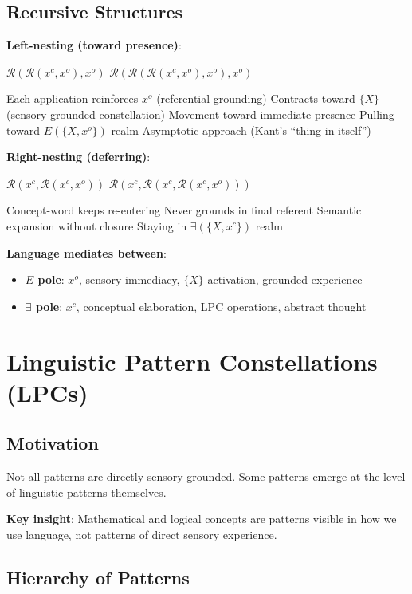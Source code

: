 \documentclass[12pt]{article}
\providecommand{\tightlist}{}   %
\begin{document}
\subsection{Recursive Structures}\label{recursive-structures}

\textbf{Left-nesting (toward presence)}:

\(\mathcal{R}(\mathcal{R}(x^c, x^o), x^o)\) \(\mathcal{R}(\mathcal{R}(\mathcal{R}(x^c, x^o), x^o), x^o)\)

Each application reinforces \(x^o\) (referential grounding) Contracts toward \(\{X\}\) (sensory-grounded constellation) Movement toward immediate presence Pulling toward \(E(\{X, x^o\})\) realm Asymptotic approach (Kant's ``thing in itself'')

\textbf{Right-nesting (deferring)}:

\(\mathcal{R}(x^c, \mathcal{R}(x^c, x^o))\) \(\mathcal{R}(x^c, \mathcal{R}(x^c, \mathcal{R}(x^c, x^o)))\)

Concept-word keeps re-entering Never grounds in final referent Semantic expansion without closure Staying in \(\exists(\{X, x^c\})\) realm

\textbf{Language mediates between}:

\begin{itemize}
\tightlist
\item
  \textbf{\(E\) pole}: \(x^o\), sensory immediacy, \(\{X\}\) activation, grounded experience
\item
  \textbf{\(\exists\) pole}: \(x^c\), conceptual elaboration, LPC operations, abstract thought
\end{itemize}

\section{Linguistic Pattern Constellations (LPCs)}\label{linguistic-pattern-constellations-lpcs}

\subsection{Motivation}\label{motivation}

Not all patterns are directly sensory-grounded. Some patterns emerge at the level of linguistic patterns themselves.

\textbf{Key insight}: Mathematical and logical concepts are patterns visible in how we use language, not patterns of direct sensory experience.

\subsection{Hierarchy of Patterns}\label{hierarchy-of-patterns}
\end{document}

